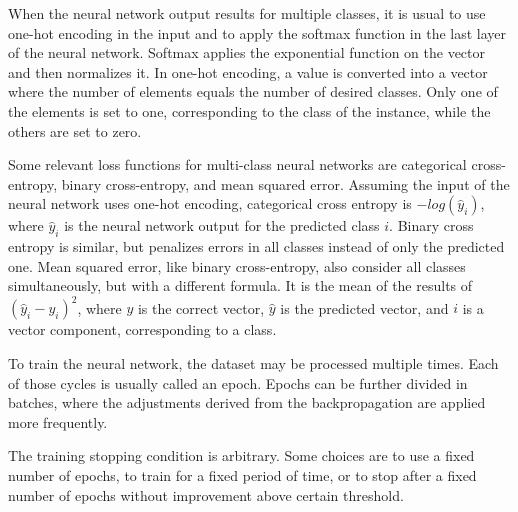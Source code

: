 When the neural network output results for multiple classes, it is usual to use one-hot encoding in the input and to apply the softmax function in the last layer of the neural network.
Softmax applies the exponential function on the vector and then normalizes it.
In one-hot encoding, a value is converted into a vector where the number of elements equals the number of desired classes. Only one of the elements is set to one, corresponding to the class of the instance, while the others are set to zero.

Some relevant loss functions for multi-class neural networks are categorical cross-entropy, binary cross-entropy, and mean squared error. 
Assuming the input of the neural network uses one-hot encoding, categorical cross entropy is $-log(\hat{y}_i)$, where $\hat{y}_i$ is the neural network output for the predicted class $i$. Binary cross entropy is similar, but penalizes errors in all classes instead of only the predicted one. Mean squared error, like binary cross-entropy, also consider all classes simultaneously, but with a different formula. It is the mean of the results of $(\hat{y}_i - y_i)^2$, where $y$ is the correct vector, $\hat{y}$ is the predicted vector, and $i$ is a vector component, corresponding to a class.

To train the neural network, the dataset may be processed multiple times. Each of those cycles is usually called an epoch. Epochs can be further divided in batches, where the adjustments derived from the backpropagation are applied more frequently.

The training stopping condition is arbitrary. Some choices are to use a fixed number of epochs, to train for a fixed period of time, or to stop after a fixed number of epochs without improvement above certain threshold.
